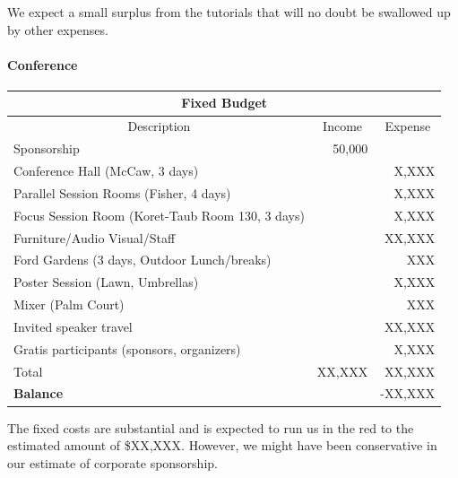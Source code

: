 \documentclass[11pt]{article}
\begin{document}
We expect a small surplus from the tutorials that will no doubt be
swallowed up by other expenses.


\paragraph{Conference}

\begin{center}
\begin{tabular}{lrr}
  \multicolumn{3}{c}{\textbf{Fixed Budget}}\\
  \hline
  \multicolumn{1}{c}{Description}
  &\multicolumn{1}{c}{Income}
  &\multicolumn{1}{c}{Expense}\\
  \hline
  Sponsorship &50,000\\
  Conference Hall (McCaw, 3 days) & &X,XXX\\
  Parallel Session Rooms (Fisher, 4 days) & &X,XXX\\
  Focus Session Room (Koret-Taub Room 130, 3 days) & &X,XXX\\
  Furniture/Audio Visual/Staff & &XX,XXX\\
  Ford Gardens (3 days, Outdoor Lunch/breaks) & &XXX\\
  Poster Session (Lawn, Umbrellas) & &X,XXX\\
  Mixer (Palm Court) & &XXX\\
  Invited speaker travel & &XX,XXX\\
  Gratis participants (sponsors, organizers) & &X,XXX\\
  \hline
  Total             &XX,XXX &XX,XXX\\
  \hline
  \textbf{Balance}             & &-XX,XXX\\
  \hline
\end{tabular}
\end{center}

The fixed costs are substantial and is expected to run us in the red
to the estimated amount of \$XX,XXX. However, we might have been
conservative in our estimate of corporate sponsorship.
\end{document}
